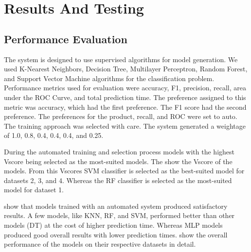\section{Results And Testing} \label{sec:results_and_testing}

\subsection{Performance Evaluation} \label{subsec:performance_evaluation}

{\responsemod
    The system is designed to use supervised algorithms for model generation. We used K-Nearest Neighbors, Decision Tree, Multilayer Perceptron, Random Forest, and Support Vector Machine algorithms for the classification problem. Performance metrics used for evaluation were accuracy, F1, precision, recall, area under the ROC Curve, and total prediction time. The preference assigned to this metric was accuracy, which had the first preference. The F1 score had the second preference. The preferences for the product, recall, and ROC were set to auto. The training approach was selected with care. The system generated a weightage of 1.0, 0.8, 0.4, 0.4, 0.4, and 0.25.

    During the automated training and selection process models with the highest Vscore being selected as the most-suited models. The  show the Vscore of the models. From this Vscores SVM classifier is selected as the best-suited model for datasets 2, 3, and 4. Whereas the RF classifier is selected as the most-suited model for dataset 1.
}

 show that models trained with an automated system produced satisfactory results. A few models, like KNN, RF, and SVM, performed better than other models (DT) at the cost of higher prediction time. Whereas MLP models produced good overall results with lower prediction times.
 show the overall performance of the models on their respective datasets in detail.

